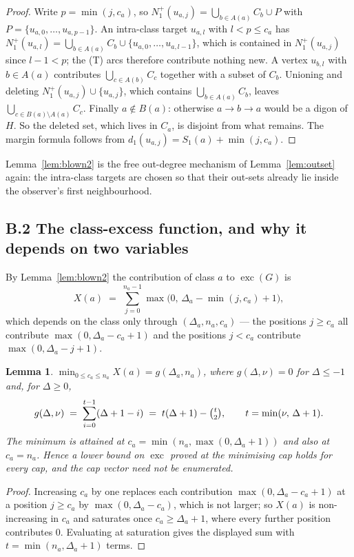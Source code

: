 \documentclass[11pt]{amsart}
\newtheorem{lemma}[theorem]{Lemma}
\theoremstyle{remark}
\newcommand{\exc}{\operatorname{exc}}
\begin{document}
\begin{proof}
Write $p = \min(j, c_a)$, so $N_1^+(u_{a,j}) = \bigcup_{b \in A(a)} C_b \cup P$
with $P = \{u_{a,0}, \dots, u_{a,p-1}\}$. An intra-class target $u_{a,l}$ with
$l < p \le c_a$ has $N_1^+(u_{a,l}) = \bigcup_{b \in A(a)} C_b \cup
\{u_{a,0},\dots,u_{a,l-1}\}$, which is contained in $N_1^+(u_{a,j})$ since
$l - 1 < p$; the (T) arcs therefore contribute nothing new. A vertex
$u_{b,l}$ with $b \in A(a)$ contributes $\bigcup_{c \in A(b)} C_c$ together
with a subset of $C_b$. Unioning and deleting $N_1^+(u_{a,j}) \cup \{u_{a,j}\}$,
which contains $\bigcup_{b \in A(a)} C_b$, leaves
$\bigcup_{c \in B(a) \setminus A(a)} C_c$. Finally $a \notin B(a)$: otherwise
$a \to b \to a$ would be a digon of $H$. So the deleted set, which lives in
$C_a$, is disjoint from what remains. The margin formula follows from
$d_1(u_{a,j}) = S_1(a) + \min(j,c_a)$.
\end{proof}

Lemma~\ref{lem:blown2} is the free out-degree mechanism of
Lemma~\ref{lem:outset} again: the intra-class targets are chosen so that their
out-sets already lie inside the observer's first neighbourhood.

\subsection*{B.2 The class-excess function, and why it depends on two
variables}

By Lemma~\ref{lem:blown2} the contribution of class $a$ to $\exc(G)$ is
\[
X(a) \;=\; \sum_{j=0}^{n_a-1} \max\bigl(0,\, \Delta_a - \min(j,c_a) + 1\bigr),
\]
which depends on the class only through $(\Delta_a, n_a, c_a)$ --- the
positions $j \ge c_a$ all contribute $\max(0, \Delta_a - c_a + 1)$ and the
positions $j < c_a$ contribute $\max(0, \Delta_a - j + 1)$.

\begin{lemma}\label{lem:capopt}
$\min_{0 \le c_a \le n_a} X(a) = g(\Delta_a, n_a)$, where $g(\Delta, \nu) = 0$
for $\Delta \le -1$ and, for $\Delta \ge 0$,
\[
g(\Delta, \nu) \;=\; \sum_{i=0}^{t-1} (\Delta + 1 - i)
\;=\; t(\Delta+1) - \tbinom{t}{2},
\qquad t = \min(\nu,\, \Delta+1).
\]
The minimum is attained at $c_a = \min(n_a, \max(0, \Delta_a+1))$ and also at
$c_a = n_a$. Hence a lower bound on $\exc$ proved at the minimising cap holds
for every cap, and the cap vector need not be enumerated.
\end{lemma}

\begin{proof}
Increasing $c_a$ by one replaces each contribution $\max(0,\Delta_a - c_a + 1)$
at a position $j \ge c_a$
by $\max(0, \Delta_a - c_a)$, which is not larger; so $X(a)$ is non-increasing
in $c_a$ and saturates once $c_a \ge \Delta_a + 1$, where every further
position contributes $0$. Evaluating at saturation gives the displayed sum
with $t = \min(n_a, \Delta_a+1)$ terms.
\end{proof}
\end{document}
